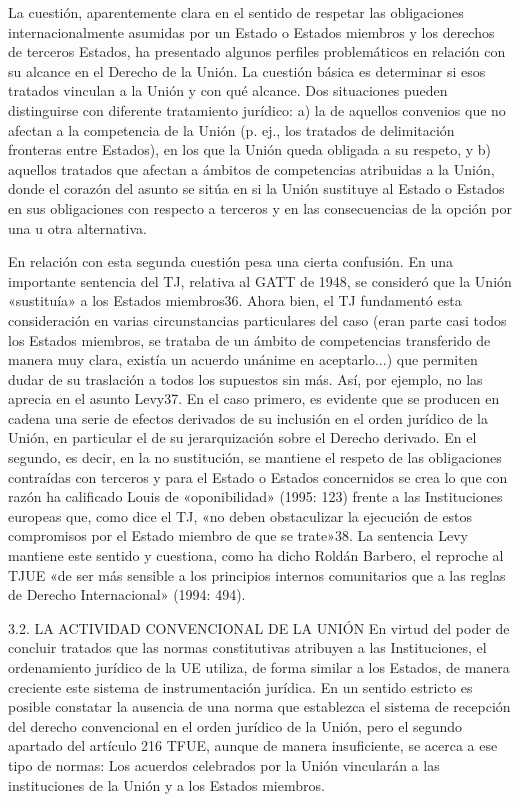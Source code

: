 \documentclass[10pt,a4paper]{article}
\begin{document}
La cuestión, aparentemente clara en el sentido de respetar las obligaciones internacionalmente asumidas por un Estado o Estados miembros y los derechos de terceros Estados, ha presentado algunos perfiles problemáticos en relación con su alcance en el Derecho de la Unión. La cuestión básica es determinar si esos tratados vinculan a la Unión y con qué alcance. Dos situaciones pueden distinguirse con diferente tratamiento jurídico: a) la de aquellos convenios que no afectan a la competencia de la Unión (p. ej., los tratados de delimitación fronteras entre Estados), en los que la Unión queda obligada a su respeto, y b) aquellos tratados que afectan a ámbitos de competencias atribuidas a la Unión, donde el corazón del asunto se sitúa en si la Unión sustituye al Estado o Estados en sus obligaciones con respecto a terceros y en las consecuencias de la opción por una u otra alternativa.

En relación con esta segunda cuestión pesa una cierta confusión. En una importante sentencia del TJ, relativa al GATT de 1948, se consideró que la Unión «sustituía» a los Estados miembros36. Ahora bien, el TJ fundamentó esta consideración en varias circunstancias particulares del caso (eran parte casi todos los Estados miembros, se trataba de un ámbito de competencias transferido de manera muy clara, existía un acuerdo unánime en aceptarlo...) que permiten dudar de su traslación a todos los supuestos sin más. Así, por ejemplo, no las aprecia en el asunto Levy37. En el caso primero, es evidente que se producen en cadena una serie de efectos derivados de su inclusión en el orden jurídico de la Unión, en particular el de su jerarquización sobre el Derecho derivado. En el segundo, es decir, en la no sustitución, se mantiene el respeto de las obligaciones contraídas con terceros y para el Estado o Estados concernidos se crea lo que con razón ha calificado Louis de «oponibilidad» (1995: 123) frente a las Instituciones europeas que, como dice el TJ, «no deben obstaculizar la ejecución de estos compromisos por el Estado miembro de que se trate»38. La sentencia Levy mantiene este sentido y cuestiona, como ha dicho Roldán Barbero, el reproche al TJUE «de ser más sensible a los principios internos comunitarios que a las reglas de Derecho Internacional» (1994: 494).

3.2. LA ACTIVIDAD CONVENCIONAL DE LA UNIÓN 
En virtud del poder de concluir tratados que las normas constitutivas atribuyen a las Instituciones, el ordenamiento jurídico de la UE utiliza, de forma similar a los Estados, de manera creciente este sistema de instrumentación jurídica. En un sentido estricto es posible constatar la ausencia de una norma que establezca el sistema de recepción del derecho convencional en el orden jurídico de la Unión, pero el segundo apartado del artículo 216 TFUE, aunque de manera insuficiente, se acerca a ese tipo de normas: Los acuerdos celebrados por la Unión vincularán a las instituciones de la Unión y a los Estados miembros.
\end{document}
